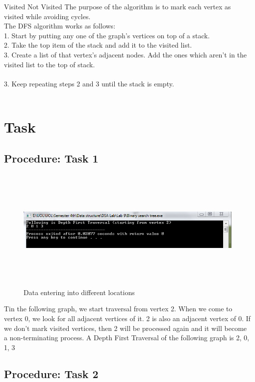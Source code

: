 \documentclass[12pt]{article}            %
\begin{document}
Visited
Not Visited
The purpose of the algorithm is to mark each vertex as visited while avoiding cycles. \\
The DFS algorithm works as follows:\\
1.	Start by putting any one of the graph's vertices on top of a stack.\\
2.	Take the top item of the stack and add it to the visited list.\\
3.	Create a list of that vertex's adjacent nodes. Add the ones which aren't in the visited list to the top of stack.\\ \\
3.	Keep repeating steps 2 and 3 until the stack is empty.\\ \\

\section{Task}  
\subsection{Procedure: Task 1 }     

\begin{figure}
\centering
  \includegraphics[width=12cm,height=6cm,keepaspectratio]{2.png}
\caption{Data entering into different locations}
\label{Figure:3}    
\end{figure}
Tin the following graph, we start traversal from vertex 2. When we come to vertex 0, we look for all adjacent vertices of it. 2 is also an adjacent vertex of 0. If we don’t mark visited vertices, then 2 will be processed again and it will become a non-terminating process. A Depth First Traversal of the following graph is 2, 0, 1, 3

\subsection{Procedure: Task 2 }     
\end{document}
